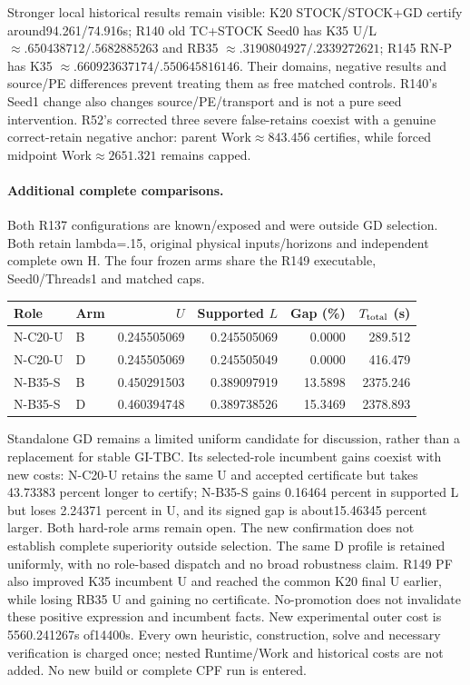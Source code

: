 Stronger local historical results remain visible: K20 STOCK/STOCK+GD
certify around94.261/74.916s; R140 old TC+STOCK Seed0 has K35
U/L$\approx.650438712/.5682885263$ and RB35
$\approx.3190804927/.2339272621$; R145 RN-P has K35
$\approx.660923637174/.550645816146$. Their domains, negative results
and source/PE differences prevent treating them as free matched controls.
R140's Seed1 change also changes source/PE/transport and is not a pure
seed intervention. R52's corrected three severe false-retains coexist with
a genuine correct-retain negative anchor: parent Work$\approx843.456$
certifies, while forced midpoint Work$\approx2651.321$ remains capped.

\paragraph{Additional complete comparisons.}
Both R137 configurations are known/exposed and were outside GD selection. Both retain lambda=.15, original physical inputs/horizons and independent complete own H. The four frozen arms share the R149 executable, Seed0/Threads1 and matched caps.
\begin{center}\small\begin{tabular}{llrrrr}
Role & Arm & $U$ & Supported $L$ & Gap (\%) & $T_{\rm total}$ (s) \\
\hline
N-C20-U & B & 0.245505069 & 0.245505069 & 0.0000 & 289.512 \\
N-C20-U & D & 0.245505069 & 0.245505049 & 0.0000 & 416.479 \\
N-B35-S & B & 0.450291503 & 0.389097919 & 13.5898 & 2375.246 \\
N-B35-S & D & 0.460394748 & 0.389738526 & 15.3469 & 2378.893 \\
\end{tabular}\end{center}
Standalone GD remains a limited uniform candidate for discussion, rather than a replacement for stable GI-TBC. Its selected-role incumbent gains coexist with new costs: N-C20-U retains the same U and accepted certificate but takes 43.73383 percent longer to certify; N-B35-S gains 0.16464 percent in supported L but loses 2.24371 percent in U, and its signed gap is about15.46345 percent larger. Both hard-role arms remain open. The new confirmation does not establish complete superiority outside selection. The same D profile is retained uniformly, with no role-based dispatch and no broad robustness claim.
R149 PF also improved K35 incumbent U and reached the common K20 final U earlier, while losing RB35 U and gaining no certificate. No-promotion does not invalidate these positive expression and incumbent facts.
New experimental outer cost is 5560.241267s of14400s. Every own heuristic, construction, solve and necessary verification is charged once; nested Runtime/Work and historical costs are not added. No new build or complete CPF run is entered.
